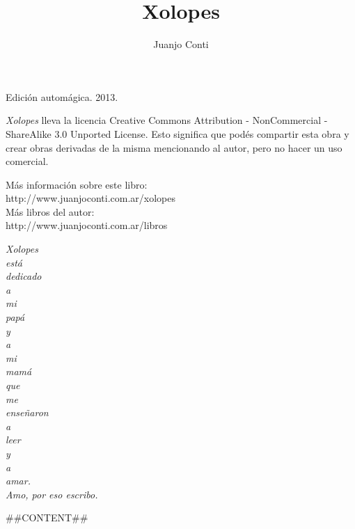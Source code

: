 \documentclass[12pt,twoside,openright,a5paper]{book}
\title{Xolopes}
\author{Juanjo Conti}
\date{}
\begin{document}
\pagestyle{plain}

\maketitle

\cleardoublepage

\thispagestyle{empty}
\noindent
Edición automágica. 2013.\\

\vspace{0.5cm}

\noindent
\emph{Xolopes} lleva la licencia 
Creative Commons Attribution - NonCommercial - ShareAlike 3.0 Unported License.
Esto significa que podés compartir esta obra y crear obras derivadas de la misma
mencionando al autor, pero no ha\-cer un uso comercial.

\vfill

\noindent
Más información sobre este libro:\\
http://www.juanjoconti.com.ar/xolopes\\

\noindent
Más libros del autor:\\
http://www.juanjoconti.com.ar/libros

\cleardoublepage

\noindent
\begin{flushright}
\emph{
\emph{Xolopes} \\está \\dedicado \\a \\mi \\papá \\y \\a \\mi \\mamá\\
que \\me \\enseñaron \\a \\leer \\y \\a \\amar.\\
\vspace{0.5cm}
Amo, por eso escribo.
}

\end{flushright}


\cleardoublepage

##CONTENT##

\vspace{0.5cm}
\hrulefill\hspace{0.2cm} \decofourleft\decofourright \hspace{0.2cm} \hrulefill
\end{document}
